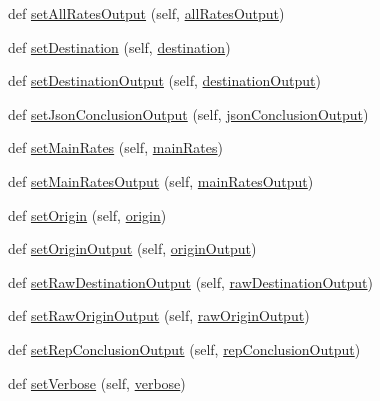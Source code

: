 \begin{DoxyCompactItemize}
\item 
def \hyperlink{classe2e_1_1_parameters_a23a4ae20df9dbbb411654c45c5bbfa17}{set\+All\+Rates\+Output} (self, \hyperlink{classe2e_1_1_parameters_ac5dfd879a297879921d905de68f7febb}{all\+Rates\+Output})
\item 
def \hyperlink{classe2e_1_1_parameters_ac63ae6d2b5f45ae78ee855953a038f14}{set\+Destination} (self, \hyperlink{classe2e_1_1_parameters_ad2cdf746b8890c53a9cab6fd7df7043b}{destination})
\item 
def \hyperlink{classe2e_1_1_parameters_a96083de53012ca50d2a345a1673802de}{set\+Destination\+Output} (self, \hyperlink{classe2e_1_1_parameters_a3b4ae5aa9b73466e51018b6f37792577}{destination\+Output})
\item 
def \hyperlink{classe2e_1_1_parameters_a449da873b24a00fd81746b4344985654}{set\+Json\+Conclusion\+Output} (self, \hyperlink{classe2e_1_1_parameters_a20ca05e6261a929f4a07b937ccce40af}{json\+Conclusion\+Output})
\item 
def \hyperlink{classe2e_1_1_parameters_a57b1265982f14c075d2f1ab909383f5d}{set\+Main\+Rates} (self, \hyperlink{classe2e_1_1_parameters_aaa2b41d7017ab4893bbe27fa8edb7180}{main\+Rates})
\item 
def \hyperlink{classe2e_1_1_parameters_ae71495be8b331f293e0d66b3251a21e9}{set\+Main\+Rates\+Output} (self, \hyperlink{classe2e_1_1_parameters_a552470d8541b7caf2bb8940e32a6fe0e}{main\+Rates\+Output})
\item 
def \hyperlink{classe2e_1_1_parameters_a421e56e53ff0aaf5222229d8a81c456b}{set\+Origin} (self, \hyperlink{classe2e_1_1_parameters_aff4d7aaa35295f7f71e546fe5554c4d9}{origin})
\item 
def \hyperlink{classe2e_1_1_parameters_a2b87a3357a16d35b7606a97e924a4904}{set\+Origin\+Output} (self, \hyperlink{classe2e_1_1_parameters_ab1ac2fc0ab2f3ef169b776c776cdb225}{origin\+Output})
\item 
def \hyperlink{classe2e_1_1_parameters_a2a4420c79bef43533fe2d9562d0faedb}{set\+Raw\+Destination\+Output} (self, \hyperlink{classe2e_1_1_parameters_a84b319098084ed505e089a600e154f6e}{raw\+Destination\+Output})
\item 
def \hyperlink{classe2e_1_1_parameters_a6a69b8936b79b34f612b3dda7bedc67f}{set\+Raw\+Origin\+Output} (self, \hyperlink{classe2e_1_1_parameters_a62b586d9863422872833e34814ac51e6}{raw\+Origin\+Output})
\item 
def \hyperlink{classe2e_1_1_parameters_a195ce8ca2660535573746b6f66a59ee4}{set\+Rep\+Conclusion\+Output} (self, \hyperlink{classe2e_1_1_parameters_a75609904252351f2d42c659c6f77b83a}{rep\+Conclusion\+Output})
\item 
def \hyperlink{classe2e_1_1_parameters_a9d1ef6cf9aaac08105966db43687423f}{set\+Verbose} (self, \hyperlink{classe2e_1_1_parameters_a84d862bf507bb0325f5daf3b7e5d9ab3}{verbose})
\end{DoxyCompactItemize}
